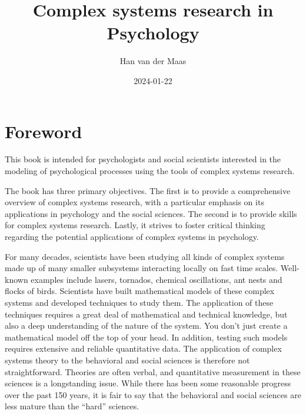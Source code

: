 \documentclass[
  a4paper,
  DIV=11,
  numbers=noendperiod]{scrreprt}
\title{Complex systems research in Psychology}
\author{Han van der Maas}
\date{2024-01-22}
\renewcommand*\contentsname{Table of contents}
\newcommand\contentsname{Table of contents}
\begin{document}
\maketitle
\ifdefined\Shaded\renewenvironment{Shaded}{\begin{tcolorbox}[breakable, sharp corners, frame hidden, boxrule=0pt, borderline west={3pt}{0pt}{shadecolor}, interior hidden, enhanced]}{\end{tcolorbox}}\fi

\renewcommand*\contentsname{Table of contents}
{
\hypersetup{linkcolor=}
\setcounter{tocdepth}{7}
\tableofcontents
}

\hypertarget{foreword}{%
\chapter*{Foreword}\label{foreword}}


This book is intended for psychologists and social scientists interested
in the modeling of psychological processes using the tools of complex
systems research.

The book has three primary objectives. The first is to provide a
comprehensive overview of complex systems research, with a particular
emphasis on its applications in psychology and the social sciences. The
second is to provide skills for complex systems research. Lastly, it
strives to foster critical thinking regarding the potential applications
of complex systems in psychology.

For many decades, scientists have been studying all kinds of complex
systems made up of many smaller subsystems interacting locally on fast
time scales. Well-known examples include lasers, tornados, chemical
oscillations, ant nests and flocks of birds. Scientists have built
mathematical models of these complex systems and developed techniques to
study them. The application of these techniques requires a great deal of
mathematical and technical knowledge, but also a deep understanding of
the nature of the system. You don't just create a mathematical model off
the top of your head. In addition, testing such models requires
extensive and reliable quantitative data. The application of complex
systems theory to the behavioral and social sciences is therefore not
straightforward. Theories are often verbal, and quantitative measurement
in these sciences is a longstanding issue. While there has been some
reasonable progress over the past 150 years, it is fair to say that the
behavioral and social sciences are less mature than the ``hard''
sciences.
\end{document}
